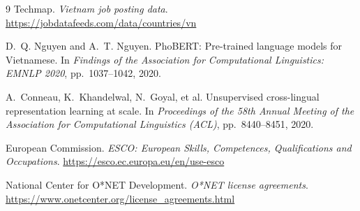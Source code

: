 \documentclass[12pt,a4paper]{article}
\begin{document}
\begin{thebibliography}{9}
Techmap. \emph{Vietnam job posting data}.
\url{https://jobdatafeeds.com/data/countries/vn}

D.~Q. Nguyen and A.~T. Nguyen.
PhoBERT: Pre-trained language models for Vietnamese.
In \emph{Findings of the Association for Computational Linguistics: EMNLP
2020}, pp.~1037--1042, 2020.

A.~Conneau, K.~Khandelwal, N.~Goyal, et al.
Unsupervised cross-lingual representation learning at scale.
In \emph{Proceedings of the 58th Annual Meeting of the Association for
Computational Linguistics (ACL)}, pp.~8440--8451, 2020.

European Commission. \emph{ESCO: European Skills, Competences,
Qualifications and Occupations}.
\url{https://esco.ec.europa.eu/en/use-esco}

National Center for O*NET Development. \emph{O*NET license agreements}.
\url{https://www.onetcenter.org/license_agreements.html}

\end{thebibliography}
\end{document}

